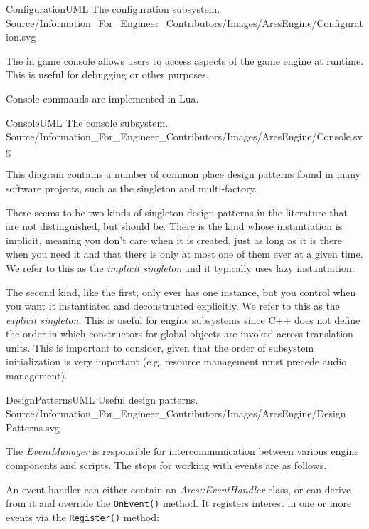 \FullPageLandscapeDiagram
    {ConfigurationUML}
    {The configuration subsystem.}
    {Source/Information_For_Engineer_Contributors/Images/AresEngine/Configuration.svg}

\page
{}
The in game console allows users to access aspects of the game engine at runtime. This is useful for debugging or other purposes.

Console commands are implemented in Lua.

\FullPageLandscapeDiagram
    {ConsoleUML}
    {The console subsystem.}
    {Source/Information_For_Engineer_Contributors/Images/AresEngine/Console.svg}

\page
{}
This diagram contains a number of common place design patterns found in many software projects, such as the singleton and multi-factory. 

There seems to be two kinds of singleton design patterns in the literature that are not distinguished, but should be. There is the kind whose instantiation is implicit, meaning you don't care when it is created, just as long as it is there when you need it and that there is only at most one of them ever at a given time. We refer to this as the {\it implicit singleton} and it typically uses lazy instantiation.

The second kind, like the first, only ever has one instance, but you control when you want it instantiated and deconstructed explicitly. We refer to this as the {\it explicit singleton}. This is useful for engine subsystems since C++ does not define the order in which constructors for global objects are invoked across translation units. This is important to consider, given that the order of subsystem initialization is very important (e.g. resource management must precede audio management).

\FullPageLandscapeDiagram
    {DesignPatternsUML}
    {Useful design patterns.}
    {Source/Information_For_Engineer_Contributors/Images/AresEngine/Design Patterns.svg}

\page 
{}
The {\it EventManager} is responsible for intercommunication between various engine components and scripts. The steps for working with events are as follows.

An event handler can either contain an {\it Ares::EventHandler} class, or can derive from it and override the {\tt OnEvent()} method. It registers interest in one or more events via the {\tt Register()} method:

